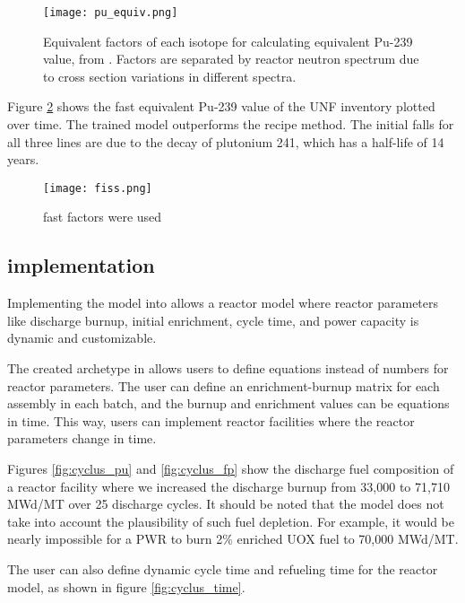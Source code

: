 \begin{figure}
    \centering
    \texttt{[image: pu\_equiv.png]}
    \caption{Equivalent factors of each isotope for
             calculating equivalent Pu-239 value,
             from \cite{anon_plutonium_1989}. Factors
             are separated by reactor neutron spectrum
             due to cross section variations in different
             spectra.}
    \label{fig:pu_equiv}
\end{figure}

Figure \ref{fig:fiss} shows the fast equivalent Pu-239
value of the \gls{UNF} inventory plotted over time.
The trained model outperforms the recipe method. The
initial falls for all three lines are due to the
decay of plutonium 241, which has a half-life of
14 years.

\begin{figure}
    \centering
    \texttt{[image: fiss.png]}
    \caption{fast factors were used}
    \label{fig:fiss}
\end{figure}




\subsection{\Cyclus implementation}

Implementing the model into \Cyclus allows a 
reactor model where reactor parameters like discharge
burnup, initial enrichment, cycle time, and power
capacity is dynamic and customizable.

The created archetype in \Cyclus allows users to define
equations instead of numbers for reactor parameters.
The user can define an enrichment-burnup matrix for
each assembly in each batch, and the burnup and enrichment
values can be equations in time. This way, users can
implement reactor facilities where the reactor parameters
change in time.

Figures \ref{fig:cyclus_pu}
and \ref{fig:cyclus_fp} show the discharge fuel composition
of a reactor facility where we increased the discharge burnup
from 33,000 to 71,710 MWd/MT over 25 discharge cycles.
It should be noted that the model does not take into account
the plausibility of such fuel depletion. For example, it
would be nearly impossible for a  \gls{PWR} to burn 2\%
enriched \gls{UOX} fuel to 70,000 MWd/MT.

The user can also define dynamic
cycle time and refueling time for the reactor model, as shown
in figure \ref{fig:cyclus_time}.



